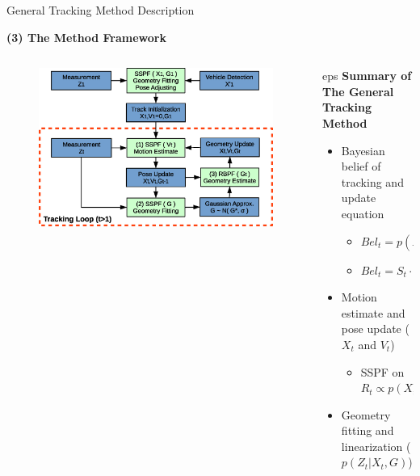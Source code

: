 \documentclass[final,hyperref={pdfpagelabels=false}]{beamer}
\begin{document}
\begin{frame}[t]
\begin{columns}[t]
\begin{column}{0.47\textwidth}
\begin{block}{General Tracking Method Description}
\vspace{1em}
\begin{center}
\textbf{(3) The Method Framework}
\end{center}
\begin{columns}[t]
	\begin{column}{0.48\textwidth}
		\begin{figure}
			\centering
			\includegraphics[width=\textwidth]{./img/framework}
			\label{fig:framework}
		\end{figure}
	\end{column}
	\begin{column}{0.48\textwidth}
		\begin{center}eps
		\textbf{Summary of The General Tracking Method}
		\end{center}
		\begin{itemize}
		\item Bayesian belief of tracking and update equation
		\begin{itemize}
		\item $Bel_t=p(X^t,V^t,G^t|Z^t)$
		\item $Bel_t=S_t \cdot R_t \cdot Bel_{t-1}$
		\end{itemize}
		\item Motion estimate and pose update ($X_t$ and $V_t$)
		\begin{itemize}
		\item SSPF on $R_t\propto p(X_t,V_t|X_{t-1},V_{t-1},G_{t-1},Z_t)$
		\end{itemize}
		\item Geometry fitting and linearization ($p(Z_t|X_t,G)$)
		\begin{itemize}

\end{itemize}
\end{itemize}
\end{column}
\end{columns}
\end{block}
\end{column}
\end{columns}
\end{frame}
\end{document}
